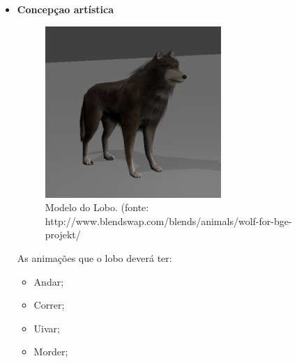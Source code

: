 \begin{itemize}
\newpage
\item {\bf Concepçao artística}

\begin{figure}[ht]
 \centering
 \includegraphics[scale=1]{Imagens/lobo01.png}
 \caption{Modelo do Lobo. (fonte: http://www.blendswap.com/blends/animals/wolf-for-bge-projekt/}
\label{img:lobo}
\end{figure}


As animações que o lobo deverá ter:
\begin{itemize}
\item {Andar;}
\item {Correr;}
\item {Uivar;}
\item {Morder;}

\end{itemize}

\end{itemize}
